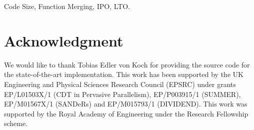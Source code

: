 \documentclass[conference,10pt]{IEEEtran}
\begin{document}
\maketitle


\begin{IEEEkeywords}
Code Size, Function Merging, IPO, LTO.
\end{IEEEkeywords}








%








\section*{Acknowledgment}
We would like to thank Tobias Edler von Koch for providing the source code for the state-of-the-art implementation. This work has been
supported by the UK Engineering and Physical Sciences Research Council (EPSRC) under grants EP/L01503X/1 (CDT in Pervasive Parallelism),
EP/P003915/1 (SUMMER), EP/M01567X/1 (SANDeRs) and EP/M015793/1 (DIVIDEND).  This work was supported by the Royal Academy of Engineering
under the Research Fellowship scheme.


%







\balance




%
\end{document}
